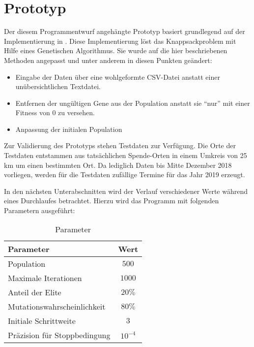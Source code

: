 \section{Prototyp}\label{sec:prototyp}

Der diesem Programmentwurf angehängte Prototyp basiert grundlegend auf der Implementierung in \cite{Quiz15Th91:online}.
Diese Implementierung löst das Knappsackproblem mit Hilfe eines Genetischen Algorithmus.
Sie wurde auf die hier beschriebenen Methoden angepasst und unter anderem
in diesen Punkten geändert:
\begin{itemize}
    \item Eingabe der Daten über eine wohlgeformte CSV-Datei anstatt einer unübersichtlichen Textdatei.
    \item Entfernen der ungültigen Gene aus der Population anstatt sie \enquote{nur} mit einer Fitness von $0$ zu versehen.
    \item Anpassung der initialen Population
\end{itemize}


\noindent
Zur Validierung des Prototyps stehen Testdaten zur Verfügung.
Die Orte der Testdaten entstammen aus tatsächlichen Spende-Orten in einem Umkreis von 25 km um einen bestimmten Ort.
Da lediglich Daten bis Mitte Dezember 2018 vorliegen,
werden für die Testdaten zufällige Termine für das Jahr 2019 erzeugt.

In den nächsten Unterabschnitten wird der Verlauf verschiedener Werte während eines Durchlaufes betrachtet.
Hierzu wird das Programm mit folgenden Parametern ausgeführt:
\begin{table}[ht]%
    \begin{center}
        \begin{tabular}{l|c}
            Parameter                       & Wert \\
            \hline
            Population                      & $500$  \\
            Maximale Iterationen            & $1000$ \\
            Anteil der Elite                & $20\%$ \\
            Mutationswahrscheinlichkeit     & $80\%$ \\
            Initiale Schrittweite           & $3$     \\
            Präzision für Stoppbedingung  & $10^{-4}$
        \end{tabular}
    \end{center}
    \caption{Parameter}
    \label{tab:parameter}
  \end{table}


